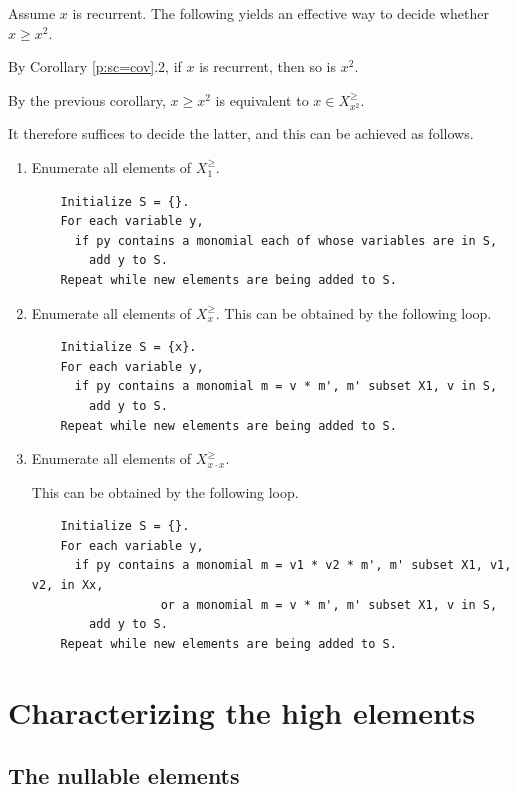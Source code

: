 \documentclass[numbers=enddot]{scrartcl}
\newcommand{\Xmon}[1]{X^{\scriptscriptstyle{\ge}}_{#1}}
\begin{document}
\begin{prop}%
  Assume $x$ is recurrent.
The following yields an effective way to decide whether $x \ge x^2$.

By Corollary \ref{p:sc=cov}.2, if $x$ is recurrent, then so is $x^2$.

By the previous corollary, $x \ge x^2$ is equivalent to $x \in \Xmon{x^2}$.

It therefore suffices to decide the latter, and this can be achieved as follows.

\begin{enumerate}
  \item Enumerate all elements of $\Xmon{1}$.
  \begin{verbatim}
    Initialize S = {}.
    For each variable y,
      if py contains a monomial each of whose variables are in S,
        add y to S.
    Repeat while new elements are being added to S.
  \end{verbatim}
    \item Enumerate all elements of $\Xmon{x}$.
  This can be obtained by the following loop.
  \begin{verbatim}
    Initialize S = {x}.
    For each variable y,
      if py contains a monomial m = v * m', m' subset X1, v in S,
        add y to S.
    Repeat while new elements are being added to S.
  \end{verbatim}

  \item  Enumerate all elements of $\Xmon{x \cdot x}$.

  This can be obtained by the following loop.
  \begin{verbatim}
    Initialize S = {}.
    For each variable y,
      if py contains a monomial m = v1 * v2 * m', m' subset X1, v1, v2, in Xx,
                  or a monomial m = v * m', m' subset X1, v in S,
        add y to S.
    Repeat while new elements are being added to S.
  \end{verbatim}
\end{enumerate}
\end{prop}

\section{Characterizing the high elements}


\subsection{The nullable elements}
\end{document}
